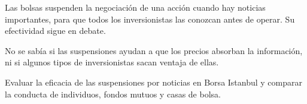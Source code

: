\documentclass{article}
\newcommand{\bodysize}{\fontsize{31}{40.9}\selectfont}
\newcommand{\cardtitlesize}{\fontsize{36.6}{43.9}\selectfont}
\newcommand{\smallsize}{\fontsize{25.4}{33.0}\selectfont}
\newcommand{\cardtitle}[2][navy]{{\color{#1}\cardtitlesize\bfseries\textls[110]{\MakeUppercase{#2}}}\par\vspace{7mm}}
\begin{document}
\vfill
\hspace*{34mm}\begin{minipage}{773mm}
\begin{tcolorbox}[enhanced, sharp corners, colback=navy, boxrule=0pt, left=16mm, right=16mm, top=12mm, bottom=11mm,
  fontupper=\bodysize\raggedright, overlay={\fill[gold] (frame.north west) rectangle ([yshift=-5mm]frame.north east);}]
\begin{minipage}[t]{174.8mm}\raggedright{\color{acento}\smallsize\bfseries{}}\par{}\end{minipage}\hfill\begin{minipage}[t]{174.8mm}\raggedright{\color{acento}\smallsize\bfseries{}}\par{}\end{minipage}\hfill\begin{minipage}[t]{174.8mm}\raggedright{\color{acento}\smallsize\bfseries{}}\par{}\end{minipage}\hfill\begin{minipage}[t]{174.8mm}\raggedright{\color{acento}\smallsize\bfseries{}}\par{}\end{minipage}
\end{tcolorbox}
\end{minipage}

\vfill
\hspace*{34mm}\begin{minipage}{773mm}
\begin{tcbraster}[raster columns=3, raster equal height, raster column skip=16mm]
\begin{tcolorbox}[card]\cardtitle{Contexto}Las bolsas suspenden la negociación de una acción cuando hay noticias importantes, para que todos los inversionistas las conozcan antes de operar. Su efectividad sigue en debate.\end{tcolorbox}
\begin{tcolorbox}[card]\cardtitle{Problema}No se sabía si las suspensiones ayudan a que los precios absorban la información, ni si algunos tipos de inversionistas sacan ventaja de ellas.\end{tcolorbox}
\begin{tcolorbox}[card]\cardtitle{Objetivo}Evaluar la eficacia de las suspensiones por noticias en Borsa Istanbul y comparar la conducta de individuos, fondos mutuos y casas de bolsa.\end{tcolorbox}
\end{tcbraster}
\end{minipage}
\end{document}
